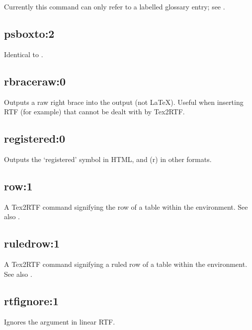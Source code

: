 Currently this command can only refer to a labelled glossary entry; see
.

\subsection*{psboxto:2}\label{psboxto}

Identical to .

\subsection*{rbraceraw:0}\label{rbraceraw}

Outputs a raw right brace into the output (not LaTeX). Useful when
inserting RTF (for example) that cannot be dealt with by Tex2RTF.

\subsection*{registered:0}\label{registered}

Outputs the `registered' symbol in HTML, and (r) in other formats.

\subsection*{row:1}\label{row}

A Tex2RTF command signifying the row of a table within the \rtfsp
environment. See also .

\subsection*{ruledrow:1}\label{ruledrow}

A Tex2RTF command signifying a ruled row of a table within the \rtfsp
environment. See also .

\subsection*{rtfignore:1}\label{rtfignore}

Ignores the argument in linear RTF.


